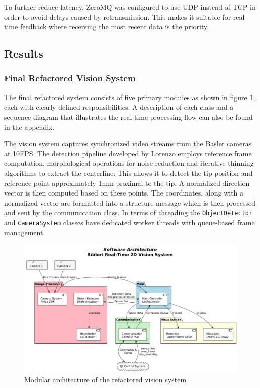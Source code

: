 To further reduce latency, ZeroMQ was configured to use UDP instead of TCP in order to avoid delays caused by retransmission. This makes it suitable for real-time feedback where receiving the most recent data is the priority. 

\subsection{Results}
\subsubsection{Final Refactored Vision System}

The final refactored system consists of five primary modules as shown in figure \ref{fig:visioncode}, each with clearly defined responsibilities. A description of each class and a sequence diagram that illustrates the real-time processing flow can also be found in the appendix.

The vision system captures synchronized video streams from the Basler cameras at 10FPS. The detection pipeline developed by Lorenzo employs reference frame computation, morphological operations for noise reduction and iterative thinning algorithms to extract the centerline. This allows it to detect the tip position and reference point approximately 1mm proximal to the tip. A normalized direction vector is then computed based on these points. The coordinates, along with a normalized vector are formatted into a structure message which is then processed and sent by the communication class. In terms of threading the \texttt{ObjectDetector} and \texttt{CameraSystem} classes have dedicated worker threads with queue-based frame management. 

\begin{figure} [H]
    \centering
    \includegraphics[width=\linewidth]{images/Software documentation/visionmodules.png}
    \caption{Modular architecture of the refactored vision system}
    \label{fig:visioncode}
\end{figure}

